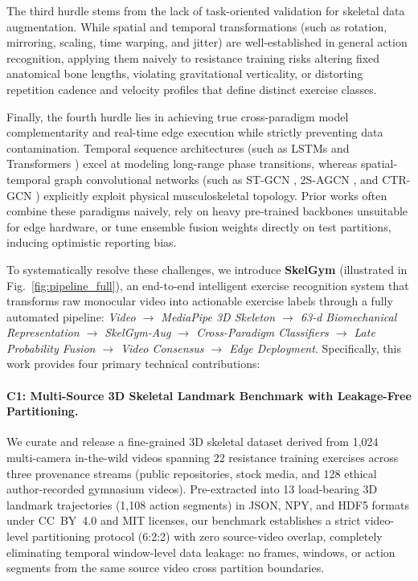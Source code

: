 \documentclass[runningheads]{llncs}
\begin{document}
The third hurdle stems from the lack of task-oriented validation for skeletal data augmentation. While spatial and temporal transformations (such as rotation, mirroring, scaling, time warping, and jitter) are well-established in general action recognition, applying them naively to resistance training risks altering fixed anatomical bone lengths, violating gravitational verticality, or distorting repetition cadence and velocity profiles that define distinct exercise classes.

Finally, the fourth hurdle lies in achieving true cross-paradigm model complementarity and real-time edge execution while strictly preventing data contamination. Temporal sequence architectures (such as LSTMs \cite{hochreiter1997long,graves2005} and Transformers \cite{vaswani2017}) excel at modeling long-range phase transitions, whereas spatial-temporal graph convolutional networks (such as ST-GCN \cite{yan2018}, 2S-AGCN \cite{shi2019two}, and CTR-GCN \cite{chen2021channel}) explicitly exploit physical musculoskeletal topology. Prior works often combine these paradigms naively, rely on heavy pre-trained backbones unsuitable for edge hardware, or tune ensemble fusion weights directly on test partitions, inducing optimistic reporting bias.

To systematically resolve these challenges, we introduce \textbf{SkelGym} (illustrated in Fig.~\ref{fig:pipeline_full}), an end-to-end intelligent exercise recognition system that transforms raw monocular video into actionable exercise labels through a fully automated pipeline: \textit{Video $\rightarrow$ MediaPipe 3D Skeleton $\rightarrow$ 63-d Biomechanical Representation $\rightarrow$ SkelGym-Aug $\rightarrow$ Cross-Paradigm Classifiers $\rightarrow$ Late Probability Fusion $\rightarrow$ Video Consensus $\rightarrow$ Edge Deployment}. Specifically, this work provides four primary technical contributions:

\paragraph{C1: Multi-Source 3D Skeletal Landmark Benchmark with Leakage-Free Partitioning.} We curate and release a fine-grained 3D skeletal dataset derived from 1,024 multi-camera in-the-wild videos spanning 22 resistance training exercises across three provenance streams (public repositories, stock media, and 128 ethical author-recorded gymnasium videos). Pre-extracted into 13 load-bearing 3D landmark trajectories (1,108 action segments) in JSON, NPY, and HDF5 formats under CC~BY~4.0 and MIT licenses, our benchmark establishes a strict video-level partitioning protocol (6:2:2) with zero source-video overlap, completely eliminating temporal window-level data leakage: no frames, windows, or action segments from the same source video cross partition boundaries.
\end{document}
